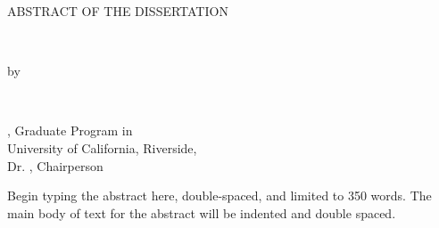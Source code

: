 \begin{center}

        ABSTRACT OF THE DISSERTATION
        \\
        \vspace{24pt}

        \Title
        \\
        \vspace{12pt}

        by
        \\
        \vspace{12pt}

        \Author
        \\
        \vspace{24pt}

        \Degree, Graduate Program in \FieldofStudy \\
        University of California, Riverside, \ConferralDate \\
        Dr. \CommChair, Chairperson
        \\
        \vspace{24pt}
\end{center}

\doublespacing
\justifying


\noindent Begin typing the abstract here, double-spaced, and limited to 350 words.
The main body of text for the abstract will be indented and double spaced.

\lipsum[1]

